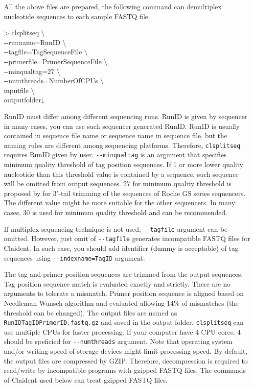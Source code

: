 \documentclass[titlepage,10pt,a4paper,english]{jsbook}
\newenvironment{cmd}{\begin{oframed}\raggedright\ttfamily\footnotesize\setlength{\baselineskip}{1.4em}}{\end{oframed}\vspace{-1em}}
\begin{document}
All the above files are prepared, the following command can demultiplex nucleotide sequences to each sample FASTQ file.
\begin{cmd}
{\textgreater} clsplitseq {\textbackslash}\\
{-}{-}runname=RunID {\textbackslash}\\
{-}{-}tagfile=TagSequenceFile {\textbackslash}\\
{-}{-}primerfile=PrimerSequenceFile {\textbackslash}\\
{-}{-}minqualtag=27 {\textbackslash}\\
{-}{-}numthreads=NumberOfCPUs {\textbackslash}\\
inputfile {\textbackslash}\\
outputfolder↓
\end{cmd}
RunID must differ among different sequencing runs.
RunID is given by sequencer in many cases, you can use such sequencer generated RunID.
RunID is usually contained in sequence file name or sequence name in sequence file, but the naming rules are different among sequencing platforms.
Therefore, \texttt{clsplitseq} requires RunID given by user.
\texttt{{-}{-}minqualtag} is an argument that specifies minimum quality threshold of tag position sequences.
If 1 or more lower quality nucleotide than this threshold value is contained by a sequence, such sequence will be omitted from output sequences.
27 for minimum quality threshold is proposed by \citet{Kunin2010} for 3'-tail trimming of the sequences of Roche GS series sequencers.
The different value might be more suitable for the other sequencers.
In many cases, 30 is used for minimum quality threshold and can be recommended.

If multiplex sequencing technique is not used, \texttt{{-}{-}tagfile} argument can be omitted.
However, just omit of \texttt{{-}{-}tagfile} generates incompatible FASTQ files for Claident.
In such case, you should add identifier (dummy is acceptable) of tag sequences using \texttt{{-}{-}indexname=TagID} argument.

The tag and primer position sequences are trimmed from the output sequences.
Tag position sequence match is evaluated exactly and strictly.
There are no arguments to tolerate a mismatch.
Primer position sequence is aligned based on Needleman-Wunsch algorithm and evaluated allowing 14\% of mismatches (the threshold can be changed).
The output files are named as \texttt{RunID{\textunderscore}{\textunderscore}TagID{\textunderscore}{\textunderscore}PrimerID.fastq.gz} and saved in the output folder.
\texttt{clsplitseq} can use multiple CPUs for faster processing.
If your computer have 4 CPU cores, 4 should be speficied for \texttt{{-}{-}numthreads} argument.
Note that operating system and/or writing speed of storage devices might limit processing speed.
By default, the output files are compressed by GZIP.
Therefore, decompression is required to read/write by incompatible programs with gzipped FASTQ files.
The commands of Claident used below can treat gzipped FASTQ files.
\end{document}

